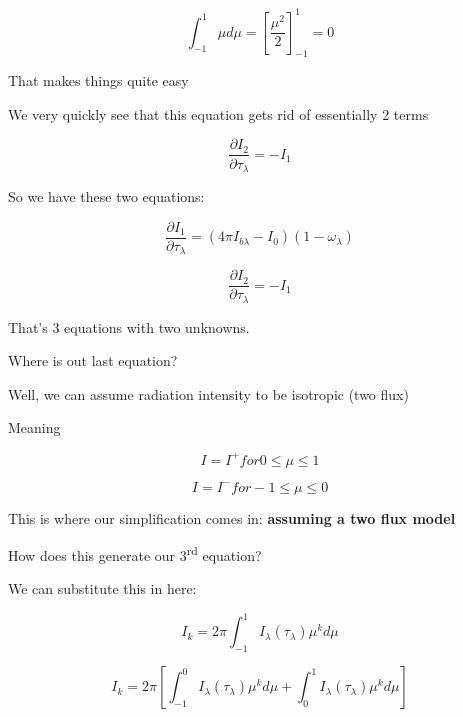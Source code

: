 \documentclass[12pt]{article}
\renewcommand{\_}{\kern-1.5pt\textunderscore\kern-1.5pt}
\begin{document}
\begin{itemize}
 \[  \int _{-1}^{1}  \mu  d \mu = \left[ \frac{ \mu ^{2}}{2} \right] _{-1}^{1}=0 \] \par

That makes things quite easy\par

We very quickly see that this equation gets rid of essentially 2 terms\par

 \[ \frac{ \partial I_{2}}{ \partial  \tau_{ \lambda }}=-I_{1} \] \par

So we have these two equations:\par

 \[ \frac{ \partial I_{1}}{ \partial  \tau_{ \lambda }}= \left( 4 \pi I_{b \lambda }-I_{0} \right)  \left( 1- \omega _{ \lambda } \right)  \] \par

 \[ \frac{ \partial I_{2}}{ \partial  \tau_{ \lambda }}=-I_{1} \] \par

That’s 3 equations with two unknowns.\par

Where is out last equation?\par

Well, we can assume radiation intensity to be isotropic (two flux)\par

Meaning \par

 \[ I=I^{+} for 0 \leq  \mu  \leq 1 \] \par

 \[ I=I^{-} for-1 \leq  \mu  \leq 0 \] \par

This is where our simplification comes in: \textbf{assuming a two flux model}\par

How does this generate our 3\textsuperscript{rd} equation?\par

We can substitute this in here:\par

 \[ I_{k}=2 \pi   \int _{-1}^{1}I_{ \lambda } \left(  \tau_{ \lambda } \right)  \mu ^{k} d \mu  \] \par

 \[ I_{k}=2 \pi   \left[  \int _{-1}^{0}I_{ \lambda } \left(  \tau_{ \lambda } \right)  \mu ^{k} d \mu + \int _{0}^{1}I_{ \lambda } \left(  \tau_{ \lambda } \right)  \mu ^{k} d \mu  \right]  \] \par


\end{itemize}
\end{document}
